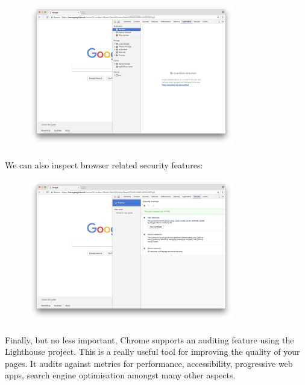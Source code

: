 \begin{figure}[H]
\centering
\includegraphics[width=0.8\textwidth]{figures/devtools-application.png}
\label{fig:devtools-application}
\end{figure}


\paragraph{} We can also inspect browser related security features:

\begin{figure}[H]
\centering
\includegraphics[width=0.8\textwidth]{figures/devtools-security.png}
\label{fig:devtools-security}
\end{figure}

\paragraph{} Finally, but no less important, Chrome supports an auditing feature using the Lighthouse project. This is a really useful tool for improving the quality of your pages. It audits against metrics for performance, accessibility, progressive web apps, search engine optimisation amongst many other aspects.

